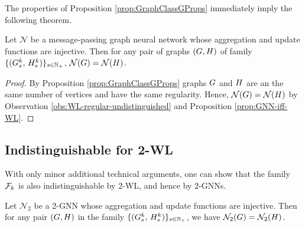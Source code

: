 The properties of Proposition \ref{prop:GraphClassGProps} immediately imply the following theorem.

\begin{theorem}
    Let $\mathcal{N}$ be a message-passing graph neural network whose aggregation and update
functions are injective. Then for any pair of graphs $(G, H)$ of family  $\{(G_s^k,\, H_s^k)\}_{s \in \mathbb{N}_+}$, $\mathcal{N}(G) = \mathcal{N}(H)$.
\end{theorem}
\begin{proof}
    By Proposition \ref{prop:GraphClassGProps} graphs $G$ and $H$ are an the same number of vertices and have the same regularity. Hence, $\mathcal{N}(G) = \mathcal{N}(H)$ by Observation \ref{obs:WL-regular-undistinguished} and Proposition \ref{prop:GNN-iff-WL}.
\end{proof}


\subsection{Indistinguishable for 2-WL}

With only minor additional technical arguments, one can show that the family $\mathcal{F}_k$ is also indistinguishable by $2$-WL, and hence by $2$-GNNs.

\begin{theorem}
    Let $\mathcal{N}_2$ be a 2-GNN whose aggregation and update
    functions are injective. Then for any pair $(G,H)$ in the family
    $\{(G_s^k,\, H_s^k)\}_{s \in \mathbb{N}_+}$, we have $\mathcal{N}_2(G)=\mathcal{N}_2(H)$.
\end{theorem}


